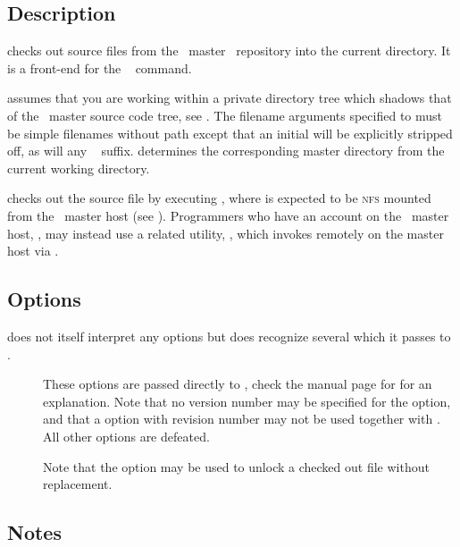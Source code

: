 \subsection*{Description}

 checks out source files from the \aipspp\ master \rcs\ repository
into the current directory.  It is a front-end for the \rcs\ 
command.

 assumes that you are working within a private directory tree which
shadows that of the \aipspp\ master source code tree, see .
The filename arguments specified to  must be simple filenames without
path except that an initial  will be explicitly stripped off, as
will any \rcs\  suffix.   determines the corresponding master
directory from the current working directory.

 checks out the source file by executing ,
where  is expected to be \textsc{nfs} mounted from the
\aipspp\ master host (see ).  Programmers who have an
account on the \aipspp\ master host, , may instead use a
related utility, , which invokes  remotely on the master
host via .

\subsection*{Options}

 does not itself interpret any options but does recognize several
which it passes to .

\begin{description}
\item[]
   These options are passed directly to , check the manual page
   for  for an explanation.  Note that no version number may be
   specified for the  option, and that a  option with revision
   number may not be used together with .  All other 
   options are defeated.

   Note that the  option may be used to unlock a checked out file
   without replacement.
\end{description}

\subsection*{Notes}

